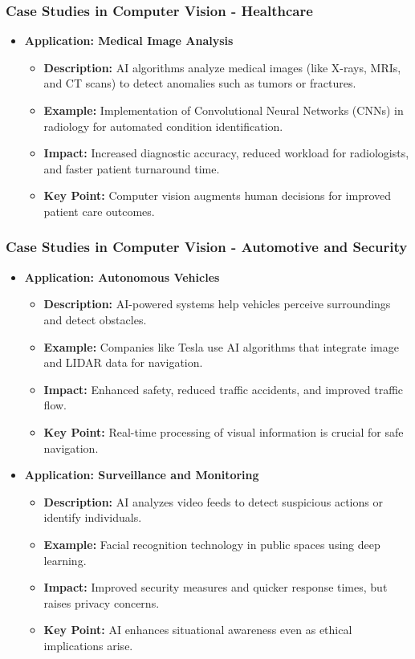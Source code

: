 \documentclass[aspectratio=169]{beamer}
\begin{document}
\begin{frame}[fragile]
  \frametitle{Case Studies in Computer Vision - Healthcare}
  \begin{itemize}
    \item \textbf{Application: Medical Image Analysis}
      \begin{itemize}
        \item \textbf{Description:} AI algorithms analyze medical images (like X-rays, MRIs, and CT scans) to detect anomalies such as tumors or fractures.
        \item \textbf{Example:} Implementation of Convolutional Neural Networks (CNNs) in radiology for automated condition identification.
        \item \textbf{Impact:} Increased diagnostic accuracy, reduced workload for radiologists, and faster patient turnaround time.
        \item \textbf{Key Point:} Computer vision augments human decisions for improved patient care outcomes.
      \end{itemize}
  \end{itemize}
\end{frame}

\begin{frame}[fragile]
  \frametitle{Case Studies in Computer Vision - Automotive and Security}
  \begin{itemize}
    \item \textbf{Application: Autonomous Vehicles}
      \begin{itemize}
        \item \textbf{Description:} AI-powered systems help vehicles perceive surroundings and detect obstacles.
        \item \textbf{Example:} Companies like Tesla use AI algorithms that integrate image and LIDAR data for navigation.
        \item \textbf{Impact:} Enhanced safety, reduced traffic accidents, and improved traffic flow.
        \item \textbf{Key Point:} Real-time processing of visual information is crucial for safe navigation.
      \end{itemize}
    
    \item \textbf{Application: Surveillance and Monitoring}
      \begin{itemize}
        \item \textbf{Description:} AI analyzes video feeds to detect suspicious actions or identify individuals.
        \item \textbf{Example:} Facial recognition technology in public spaces using deep learning.
        \item \textbf{Impact:} Improved security measures and quicker response times, but raises privacy concerns.
        \item \textbf{Key Point:} AI enhances situational awareness even as ethical implications arise.
      \end{itemize}
  \end{itemize}
\end{frame}
\end{document}

